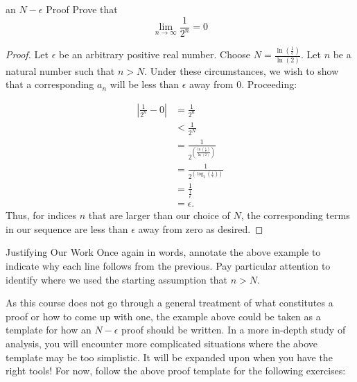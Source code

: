\begin{example}{ an $N-\epsilon$ Proof}
Prove that $$\lim_{n\rightarrow \infty}\frac{1}{2^n}=0 $$
\begin{proof}
Let $\epsilon$ be an arbitrary positive real number.  Choose $N=\frac{\ln\left(\frac{1}{\epsilon}\right)}{\ln\left(2\right)}$.  Let $n$ be a natural number such that $n>N$.  Under these circumstances, we wish to show that a corresponding $a_n$ will be less than $\epsilon$ away from $0$.  Proceeding:

\begin{align*}
\left|\frac{1}{2^n}-0\right|&=\frac{1}{2^n} \\
&<\frac{1}{2^N} \\
&=\frac{1}{2^{\left(\frac{\ln\left(\frac{1}{\epsilon}\right)}{\ln\left(2\right)}\right)}} \\
&=\frac{1}{2^{\left(\log_2\left(\frac{1}{\epsilon}\right)\right)}} \\
&=\frac{1}{\frac{1}{\epsilon}} \\
&=\epsilon.
\end{align*}
Thus, for indices $n$ that are larger than our choice of $N$, the corresponding terms in our sequence are less than $\epsilon$ away from zero as desired.
\end{proof}
\end{example}

\begin{exercise}{Justifying Our Work \Coffeecup}
Once again in words, annotate the above example to indicate why each line follows from the previous.  Pay particular attention to identify where we used the starting assumption that $n>N$.
\end{exercise}

As this course does not go through a general treatment of what constitutes a proof or how to come up with one, the example above could be taken as a template for how an $N-\epsilon$ proof should be written.  In a more in-depth study of analysis, you will encounter more complicated situations where the above template may be too simplistic.  It will be expanded upon when you have the right tools!  For now, follow the above proof template for the following exercises:

